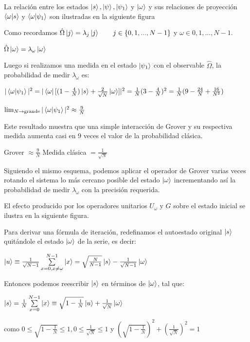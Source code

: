 La relación entre los estados $\ket{s}, \ket{\psi}, \ket{\psi_1}$ y $\ket{\omega}$
y sus relaciones de proyección $\braket{\omega}{s}$ y $\braket{\omega}{\psi_1}$
son ilustradas en la siguiente figura

Como recordamos $\hat{\Omega}\ket{j} = \lambda_j \ket{j} \qquad j \in
\{0,1,...,N-1\}$ y $\omega \in {0,1,...,N-1}$.

$\hat{\Omega} \ket{\omega} = \lambda_\omega \ket{\omega}$

Luego si realizamos una medida en el estado $\ket{\psi_1}$ con el observable
$\hat{\Omega}$, la probabilidad de medir $\lambda_\omega$ es:

$|\braket{\omega}{\psi_1}|^2 = |\bra{\omega} [(1-\frac{4}{N})\ket{s} +
\frac{2}{\sqrt{N}} \ket{\omega}]|^2 = \frac{1}{N}(3-\frac{4}{N})^2 = \frac{1}{N}
(9 - \frac{24}{N} + \frac{16}{N^2})$

$\lim_{N \to \text{grande}} |\braket{\omega}{\psi_1}|^2 \approx \frac{9}{N}$

Este resultado muestra que una simple interacción de Grover y su respectiva
medida aumenta casi en 9 veces el valor de la probabilidad clásica.

Grover $\approx \frac{9}{N}$ Medida clásica $= \frac{1}{\sqrt{N}}$

Siguiendo el mismo esquema, podemos aplicar el operador de Grover varias veces
rotando el sistema lo más cercano posible del estado $\ket{\omega}$
incrementando así la probabilidad de medir $\lambda_\omega$ con la precisión
requerida.

El efecto producido por los operadores unitarios $U_\omega$ y $G$ sobre el
estado inicial se ilustra en la siguiente figura.


Para derivar una fórmula de iteración, redefinamos el autoestado original
$\ket{s}$ quitándole el estado $\ket{\omega}$ de la serie, es decir:

$\ket{u} \equiv \frac{1}{\sqrt{N-1}} \sum\limits_{x=0, x\neq\omega}^{N-1}
\ket{x} = \sqrt{\frac{N}{N-1}} \ket{s} - \frac{1}{\sqrt{N-1}} \ket{\omega}$

Entonces podemos reescribir $\ket{s}$ en términos de $\ket{\omega}$, tal que:

$\ket{s} = \frac{1}{N} \sum\limits_{x=0}^{N-1} \ket{x} \equiv
\sqrt{1-\frac{1}{N}} \ket{u} + \frac{1}{\sqrt{N}} \ket{\omega}$

como $0\leq \sqrt{1-\frac{1}{N}} \leq 1, 0\leq \frac{1}{\sqrt{N}} \leq 1$ y
$(\sqrt{1-\frac{1}{N}})^2 + (\frac{1}{\sqrt{N}})^2 = 1$

